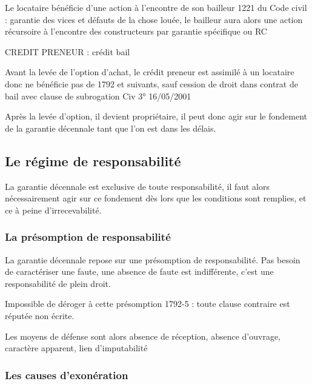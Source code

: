 		Le locataire bénéficie d’une action à l’encontre de son bailleur 1221 du Code civil : garantie des vices et défauts de la chose louée, le bailleur aura alors une action récursoire à l’encontre des constructeurs par garantie spécifique ou RC

		CREDIT PRENEUR : crédit bail

		Avant la levée de l’option d’achat, le crédit preneur est assimilé à un locataire donc ne bénéficie pas de 1792 et suivants, sauf cession de droit dans contrat de bail avec clause de subrogation Civ 3° 16/05/2001

		Après la levée d’option, il devient propriétaire, il peut donc agir sur le fondement de la garantie décennale tant que l’on est dans les délais.


	\subsection{Le régime de responsabilité}

	La garantie décennale est exclusive de toute responsabilité, il faut alors nécessairement agir sur ce fondement dès lors que les conditions sont remplies, et ce à peine d’irrecevabilité.

		\subsubsection{La présomption de responsabilité}

		La garantie décennale repose sur une présomption de responsabilité. Pas besoin de caractériser une faute, une absence de faute est indifférente, c’est une responsabilité de plein droit.

		Impossible de déroger à cette présomption 1792-5 : toute clause contraire est réputée non écrite.

		Les moyens de défense sont alors absence de réception, absence d’ouvrage, caractère apparent, lien d’imputabilité


		\subsubsection{Les causes d'exonération}

